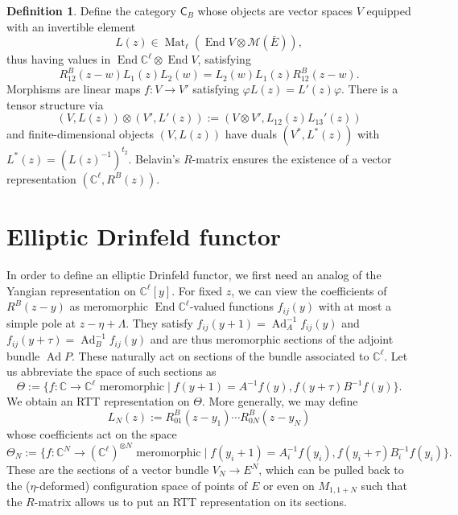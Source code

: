 \documentclass[11pt]{report}
\theoremstyle{definition}
\newtheorem{definition}[theorem]{Definition}
\theoremstyle{remark}
\theoremstyle{remark}
\newcommand{\C}{\mathbb{C}}
\begin{document}
\cite{article:etingof:1998}

\begin{definition}
Define the category $\mathsf{C}_B$ whose objects are vector spaces $V$ equipped with an invertible element
\begin{equation*}
L(z) \in \operatorname{Mat}_\ell(\operatorname{End} V \otimes \mathcal{M}(\bar E)),
\end{equation*}
thus having values in $\operatorname{End} \C^\ell \otimes \operatorname{End} V$, satisfying
\begin{equation*}
R_{12}^B(z-w) L_1(z) L_2(w) = L_2(w) L_1(z) R_{12}^B(z-w).
\end{equation*}
Morphisms are linear maps $f: V \to V'$ satisfying $\varphi L(z) = L'(z) \varphi$. There is a tensor structure via
\begin{equation*}
(V,L(z)) \otimes (V',L'(z)) := (V \otimes V', L_{12}(z) L_{13}'(z))
\end{equation*}
and finite-dimensional objects $(V,L(z))$ have duals $(V^*,L^*(z))$ with $L^*(z) = (L(z)^{-1})^{t_2}$. Belavin's $R$-matrix ensures the existence of a vector representation $(\C^\ell,R^B(z))$.
\end{definition}

\section{Elliptic Drinfeld functor}

In order to define an elliptic Drinfeld functor, we first need an analog of the Yangian representation on $\C^\ell[y]$. For fixed $z$, we can view the coefficients of $R^B(z-y)$ as meromorphic $\operatorname{End} \C^\ell$-valued functions $f_{ij}(y)$ with at most a simple pole at $z-\eta + \Lambda$. They satisfy $f_{ij}(y+1) = \operatorname{Ad}_A^{-1} f_{ij}(y)$ and $f_{ij}(y+\tau) = \operatorname{Ad}_B^{-1} f_{ij}(y)$ and are thus meromorphic sections of the adjoint bundle $\operatorname{Ad} P$. These naturally act on sections of the bundle associated to $\C^\ell$. Let us abbreviate the space of such sections as
\begin{equation*}
\Theta := \{ f: \C \to \C^\ell \text{ meromorphic} \mid f(y+1) = A^{-1} f(y), f(y+\tau) B^{-1} f(y) \}.
\end{equation*}
We obtain an RTT representation on $\Theta$. More generally, we may define
\begin{equation*}
L_N(z) := R_{01}^B(z-y_1) \cdots R_{0N}^B(z-y_N)
\end{equation*}
whose coefficients act on the space
\begin{equation*}
\Theta_N := \{ f: \C^N \to (\C^\ell)^{\otimes N} \text{ meromorphic} \mid f(y_i+1) = A_i^{-1} f(y_i), f(y_i+\tau) B_i^{-1} f(y_i) \}.
\end{equation*}
These are the sections of a vector bundle $V_N \to E^N$, which can be pulled back to the ($\eta$-deformed) configuration space of points of $E$ or even on $M_{1,1+N}$ such that the $R$-matrix allows us to put an RTT representation on its sections.
\end{document}
